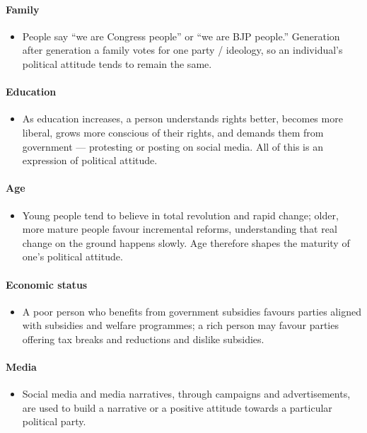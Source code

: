 \paragraph{Family}
\begin{itemize}
\item People say ``we are Congress people'' or ``we are BJP people.'' Generation after generation a family votes for one party / ideology, so an individual's political attitude tends to remain the same.
\end{itemize}

\paragraph{Education}
\begin{itemize}
\item As education increases, a person understands rights better, becomes more liberal, grows more conscious of their rights, and demands them from government --- protesting or posting on social media. All of this is an expression of political attitude.
\end{itemize}

\paragraph{Age}
\begin{itemize}
\item Young people tend to believe in total revolution and rapid change; older, more mature people favour incremental reforms, understanding that real change on the ground happens slowly. Age therefore shapes the maturity of one's political attitude.
\end{itemize}

\paragraph{Economic status}
\begin{itemize}
\item A poor person who benefits from government subsidies favours parties aligned with subsidies and welfare programmes; a rich person may favour parties offering tax breaks and reductions and dislike subsidies.
\end{itemize}

\paragraph{Media}
\begin{itemize}
\item Social media and media narratives, through campaigns and advertisements, are used to build a narrative or a positive attitude towards a particular political party.
\end{itemize}

